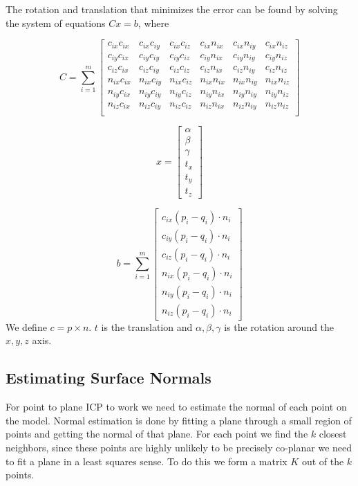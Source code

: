 \documentclass[conference]{IEEEtran}
\begin{document}
The rotation and translation that minimizes the error can be found by solving the system of equations $Cx = b$, where

\[
C = \sum_{i=1}^{m}{
  \begin{bmatrix}
    c_{ix}c_{ix} & c_{ix}c_{iy} & c_{ix}c_{iz} & c_{ix}n_{ix} & c_{ix}n_{iy}& c_{ix}n_{iz} \\
    c_{iy}c_{ix} & c_{iy}c_{iy} & c_{iy}c_{iz} & c_{iy}n_{ix} & c_{iy}n_{iy}& c_{iy}n_{iz} \\
    c_{iz}c_{ix} & c_{iz}c_{iy} & c_{iz}c_{iz} & c_{iz}n_{ix} & c_{iz}n_{iy}& c_{iz}n_{iz} \\

    n_{ix}c_{ix} & n_{ix}c_{iy} & n_{ix}c_{iz} & n_{ix}n_{ix} & n_{ix}n_{iy}& n_{ix}n_{iz} \\
    n_{iy}c_{ix} & n_{iy}c_{iy} & n_{iy}c_{iz} & n_{iy}n_{ix} & n_{iy}n_{iy}& n_{iy}n_{iz} \\
    n_{iz}c_{ix} & n_{iz}c_{iy} & n_{iz}c_{iz} & n_{iz}n_{ix} & n_{iz}n_{iy}& n_{iz}n_{iz} \\
  \end{bmatrix}
}
\]

\[
x = 
\begin{bmatrix}
  \alpha \\ \beta \\ \gamma \\ t_x \\ t_y \\ t_z
\end{bmatrix}
\]

\[
b = \sum_{i=1}^{m}{
  \begin{bmatrix}
    c_{ix}(p_i - q_i) \cdot n_i \\
    c_{iy}(p_i - q_i) \cdot n_i \\
    c_{iz}(p_i - q_i) \cdot n_i \\
    n_{ix}(p_i - q_i) \cdot n_i \\
    n_{iy}(p_i - q_i) \cdot n_i \\
    n_{iz}(p_i - q_i) \cdot n_i
  \end{bmatrix}
}
\]
We define $c = p \times n$. $t$ is the translation and $\alpha, \beta, \gamma$ is the rotation around the $x, y, z$ axis.

\subsection{Estimating Surface Normals}

For point to plane ICP to work we need to estimate the normal of each point on the model. Normal estimation is done by fitting a plane through a small region of points and getting the normal of that plane. For each point we find the $k$ closest neighbors, since these points are highly unlikely to be precisely co-planar we need to fit a plane in a least squares sense. To do this we form a matrix $K$ out of the $k$ points.
\end{document}
